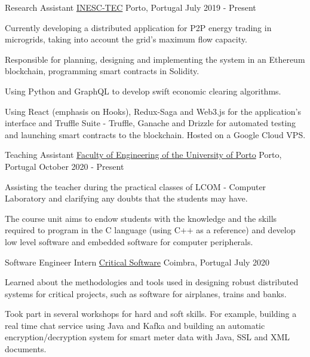 
\begin{cventries}
  \cventry
    {Research Assistant} %
    {\href{https://www.inesctec.pt/en}{INESC-TEC}} %
    {Porto, Portugal} %
    {July 2019 - Present} %
    {
      \begin{cvitems} %
        \item {Currently developing a distributed application for P2P energy trading in microgrids, taking into account the grid's maximum flow capacity.}
        \item {Responsible for planning, designing and implementing the system in an Ethereum blockchain, programming smart contracts in Solidity.}
        \item {Using Python and GraphQL to develop swift economic clearing algorithms.}
        \item {Using React (emphasis on Hooks), Redux-Saga and Web3.js for the application's interface and Truffle Suite - Truffle, Ganache and Drizzle for automated testing and launching smart contracts to the blockchain. Hosted on a Google Cloud VPS.}
      \end{cvitems}
    }

    \cventry
    {Teaching Assistant} %
    {\href{https://sigarra.up.pt/feup/en/ucurr_geral.ficha_uc_view?pv_ocorrencia_id=459473}{Faculty of Engineering of the University of Porto}} %
    {Porto, Portugal} %
    {October 2020 - Present} %
    {
      \begin{cvitems} %
        \item {Assisting the teacher during the practical classes of LCOM - Computer Laboratory and clarifying any doubts that the students may have.}
        \item {The course unit aims to endow students with the knowledge and the skills required to program in the C language (using C++ as a reference) and develop low level software and embedded software for computer peripherals.}
      \end{cvitems}
    }

  \cventry
    {Software Engineer Intern} %
    {\href{https://www.criticalsoftware.com/en}{Critical Software}} %
    {Coimbra, Portugal} %
    {July 2020} %
    {
      \begin{cvitems} %
        \item {Learned about the methodologies and tools used in designing robust distributed systems for critical projects, such as software for airplanes, trains and banks.}
        \item {Took part in several workshops for hard and soft skills. For example, building a real time chat service using Java and Kafka and building an automatic encryption/decryption system for smart meter data with Java, SSL and XML documents.}
      \end{cvitems}
    }


\end{cventries}
